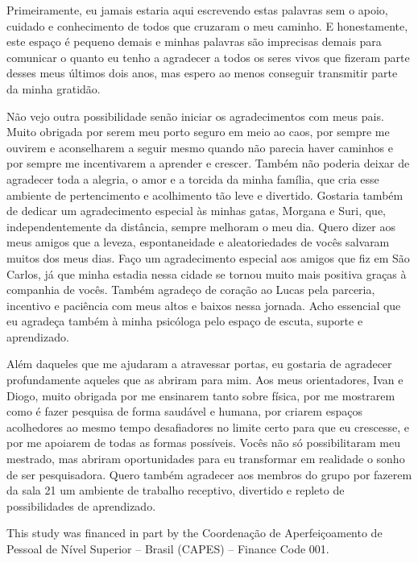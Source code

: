 \begin{agradecimentos}

	Primeiramente, eu jamais estaria aqui escrevendo estas palavras sem o apoio, cuidado e conhecimento de todos que cruzaram o meu caminho. E honestamente, este espaço é pequeno demais e minhas palavras são imprecisas demais para comunicar o quanto eu tenho a agradecer a todos os seres vivos que fizeram parte desses meus últimos dois anos, mas espero ao menos conseguir transmitir parte da minha gratidão.
	
	Não vejo outra possibilidade senão iniciar os agradecimentos com meus pais. Muito obrigada por serem meu porto seguro em meio ao caos, por sempre me ouvirem e aconselharem a seguir mesmo quando não parecia haver caminhos e por sempre me incentivarem a aprender e crescer. Também não poderia deixar de agradecer toda a alegria, o amor e a torcida da minha família, que cria esse ambiente de pertencimento e acolhimento tão leve e divertido. Gostaria também de dedicar um agradecimento especial às minhas gatas, Morgana e Suri, que, independentemente da distância, sempre melhoram o meu dia. Quero dizer aos meus amigos que a leveza, espontaneidade e aleatoriedades de vocês salvaram muitos dos meus dias. Faço um agradecimento especial aos amigos que fiz em São Carlos, já que minha estadia nessa cidade se tornou muito mais positiva graças à companhia de vocês. Também agradeço de coração ao Lucas pela parceria, incentivo e paciência com meus altos e baixos nessa jornada. Acho essencial que eu agradeça também à minha psicóloga pelo espaço de escuta, suporte e aprendizado.
	
	Além daqueles que me ajudaram a atravessar portas, eu gostaria de agradecer profundamente aqueles que as abriram para mim. Aos meus orientadores, Ivan e Diogo, muito obrigada por me ensinarem tanto sobre física, por me mostrarem como é fazer pesquisa de forma saudável e humana, por criarem espaços acolhedores ao mesmo tempo desafiadores no limite certo para que eu crescesse, e por me apoiarem de todas as formas possíveis. Vocês não só possibilitaram meu mestrado, mas abriram oportunidades para eu transformar em realidade o sonho de ser pesquisadora. Quero também agradecer aos membros do grupo por fazerem da sala 21 um ambiente de trabalho receptivo, divertido e repleto de possibilidades de aprendizado.

    
	
	This study was financed in part by the Coordenação de Aperfeiçoamento de Pessoal de Nível Superior – Brasil (CAPES) – Finance Code 001.
	
\end{agradecimentos}
